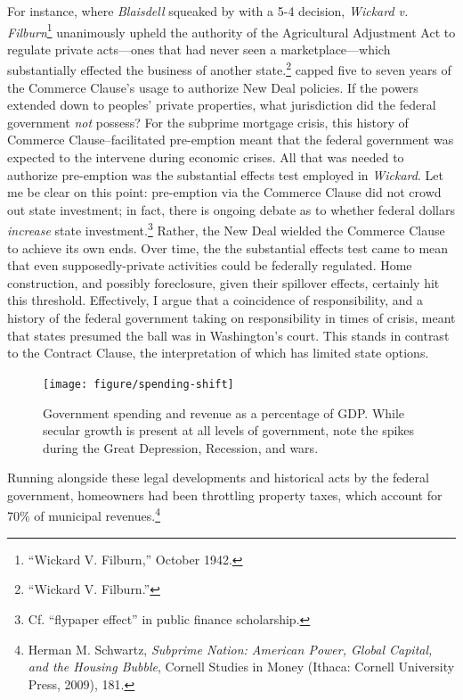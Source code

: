 \documentclass[12pt,oneside]{psthesis}
\begin{document}
For instance, where \emph{Blaisdell} squeaked by with a 5-4 decision, \emph{Wickard v. Filburn}\footnote{``Wickard V. Filburn,'' October 1942.} unanimously upheld the authority of the Agricultural Adjustment Act to regulate private acts---ones that had never seen a marketplace---which substantially effected the business of another state.\footnote{``Wickard V. Filburn.''} capped five to seven years of the Commerce Clause's usage to authorize New Deal policies.
If the powers extended down to peoples' private properties, what jurisdiction did the federal government \emph{not} possess?
For the subprime mortgage crisis, this history of Commerce Clause--facilitated pre-emption meant that the federal government was expected to the intervene during economic crises.
All that was needed to authorize pre-emption was the substantial effects test employed in \emph{Wickard}.
Let me be clear on this point: pre-emption via the Commerce Clause did not crowd out state investment; in fact, there is ongoing debate as to whether federal dollars \emph{increase} state investment.\footnote{Cf. ``flypaper effect'' in public finance scholarship.}
Rather, the New Deal wielded the Commerce Clause to achieve its own ends.
Over time, the the substantial effects test came to mean that even supposedly-private activities could be federally regulated.
Home construction, and possibly foreclosure, given their spillover effects, certainly hit this threshold.
Effectively, I argue that a coincidence of responsibility, and a history of the federal government taking on responsibility in times of crisis, meant that states presumed the ball was in Washington's court.
This stands in contrast to the Contract Clause, the interpretation of which has limited state options.
\begin{figure}

{\centering \texttt{[image: figure/spending-shift]} 

}

\caption{Government spending and revenue as a percentage of GDP. While secular growth is present at all levels of government, note the spikes during the Great Depression, Recession, and wars.}\label{fig:spending-shift}
\end{figure}
Running alongside these legal developments and historical acts by the federal government, homeowners had been throttling property taxes, which account for 70\% of municipal revenues.\footnote{Herman M. Schwartz, \emph{Subprime Nation: American Power, Global Capital, and the Housing Bubble}, Cornell Studies in Money (Ithaca: Cornell University Press, 2009), 181.}
\end{document}
